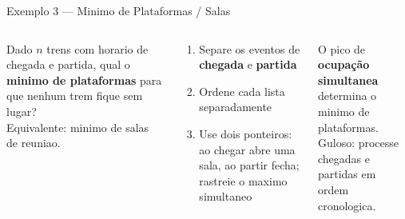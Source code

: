 \documentclass[aspectratio=169,10pt]{beamer}
\begin{document}
\begin{frame}{Exemplo 3 --- Minimo de Plataformas / Salas}
  \begin{columns}[c]
      \begin{tcolorbox}[caixaAzul,title={Problema}]
        \small
        Dado $n$ trens com horario de chegada e partida,
        qual o \textbf{minimo de plataformas} para
        que nenhum trem fique sem lugar?\\[4pt]
        Equivalente: minimo de salas de reuniao.
      \end{tcolorbox}
      \vspace{0.1cm}
      \begin{tcolorbox}[caixaDourada,title={Estrategia Gulosa}]
        \footnotesize
        \begin{enumerate}\footnotesize
          \item Separe os eventos de \textbf{chegada} e \textbf{partida}
          \item Ordene cada lista separadamente
          \item Use dois ponteiros: ao chegar abre uma sala,
                ao partir fecha; rastreie o maximo simultaneo
        \end{enumerate}
      \end{tcolorbox}
      \vspace{0.1cm}
      \begin{tcolorbox}[caixaVerde,title={Intuição}]
        \footnotesize
        O pico de \textbf{ocupação simultanea}
        determina o minimo de plataformas.\\
        Guloso: processe chegadas e partidas
        em ordem cronologica.
      \end{tcolorbox}
      \centering
\end{columns}
\end{frame}
\end{document}
